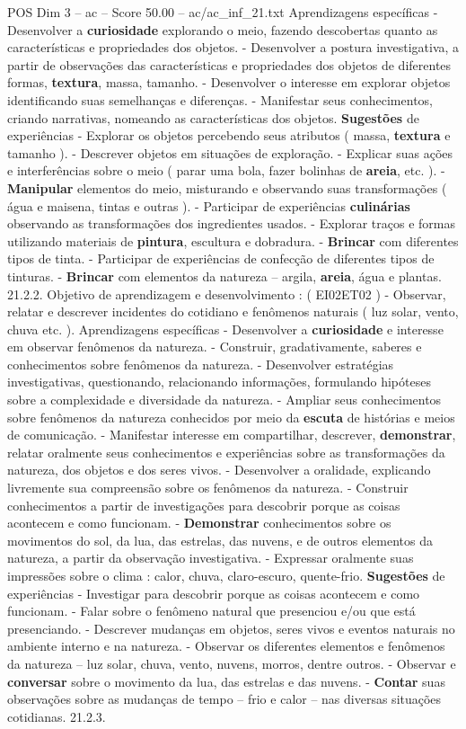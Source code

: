 \begin{textsample}{POS Dim 3 – ac – Score 50.00 – ac/ac\_inf\_21.txt}
Aprendizagens específicas - Desenvolver a \textbf{curiosidade} explorando o meio, fazendo descobertas quanto as características e propriedades dos objetos. - Desenvolver a postura investigativa, a partir de observações das características e propriedades dos objetos de diferentes formas, \textbf{textura}, massa, tamanho. - Desenvolver o interesse em explorar objetos identificando suas semelhanças e diferenças. - Manifestar seus conhecimentos, criando narrativas, nomeando as características dos objetos. \textbf{Sugestões} de experiências - Explorar os objetos percebendo seus atributos ( massa, \textbf{textura} e tamanho ). - Descrever objetos em situações de exploração. - Explicar suas ações e interferências sobre o meio ( parar uma bola, fazer bolinhas de \textbf{areia}, etc. ). - \textbf{Manipular} elementos do meio, misturando e observando suas transformações ( água e maisena, tintas e outras ). - Participar de experiências \textbf{culinárias} observando as transformações dos ingredientes usados. - Explorar traços e formas utilizando materiais de \textbf{pintura}, escultura e dobradura. - \textbf{Brincar} com diferentes tipos de tinta. - Participar de experiências de confecção de diferentes tipos de tinturas. - \textbf{Brincar} com elementos da natureza – argila, \textbf{areia}, água e plantas. 21.2.2.
Objetivo de aprendizagem e desenvolvimento : ( EI02ET02 ) - Observar, relatar e descrever incidentes do cotidiano e fenômenos naturais ( luz solar, vento, chuva etc. ).
Aprendizagens específicas - Desenvolver a \textbf{curiosidade} e interesse em observar fenômenos da natureza. - Construir, gradativamente, saberes e conhecimentos sobre fenômenos da natureza. - Desenvolver estratégias investigativas, questionando, relacionando informações, formulando hipóteses sobre a complexidade e diversidade da natureza. - Ampliar seus conhecimentos sobre fenômenos da natureza conhecidos por meio da \textbf{escuta} de histórias e meios de comunicação. - Manifestar interesse em compartilhar, descrever, \textbf{demonstrar}, relatar oralmente seus conhecimentos e experiências sobre as transformações da natureza, dos objetos e dos seres vivos. - Desenvolver a oralidade, explicando livremente sua compreensão sobre os fenômenos da natureza. - Construir conhecimentos a partir de investigações para descobrir porque as coisas acontecem e como funcionam. - \textbf{Demonstrar} conhecimentos sobre os movimentos do sol, da lua, das estrelas, das nuvens, e de outros elementos da natureza, a partir da observação investigativa. - Expressar oralmente suas impressões sobre o clima : calor, chuva, claro-escuro, quente-frio. \textbf{Sugestões} de experiências - Investigar para descobrir porque as coisas acontecem e como funcionam. - Falar sobre o fenômeno natural que presenciou e/ou que está presenciando. - Descrever mudanças em objetos, seres vivos e eventos naturais no ambiente interno e na natureza. - Observar os diferentes elementos e fenômenos da natureza – luz solar, chuva, vento, nuvens, morros, dentre outros. - Observar e \textbf{conversar} sobre o movimento da lua, das estrelas e das nuvens. - \textbf{Contar} suas observações sobre as mudanças de tempo – frio e calor – nas diversas situações cotidianas. 21.2.3.

\end{textsample}
